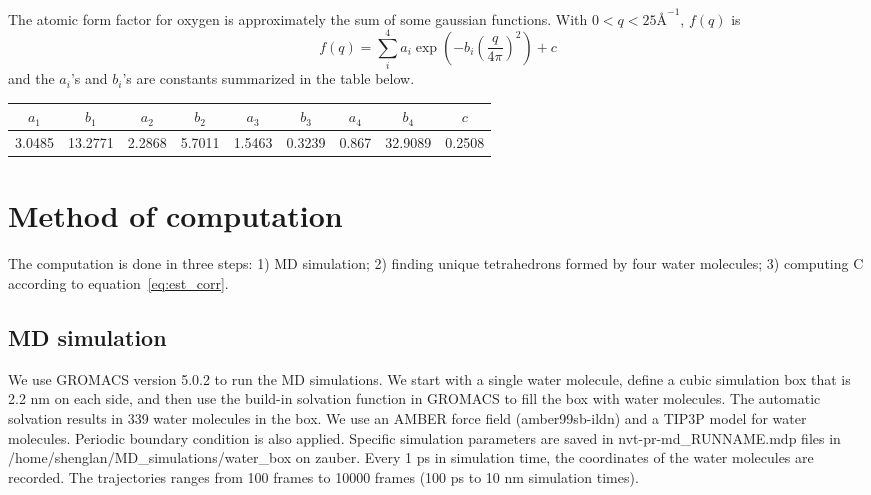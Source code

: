 \documentclass[20pt]{article}
\begin{document}
The atomic form factor for oxygen is approximately the sum of some gaussian functions. With $0 < q < 25 \si{\angstrom} ^{-1}$, $f(q)$ is
\begin{equation} \label{eq:Oform}
f(q) = \sum_{i}^{4} a_i \exp{(-b_i (\frac{q}{4\pi})^2)} + c
\end{equation}
and the $a_i$'s and $b_i$'s are constants summarized in the table below.
\begin{center}
\begin{tabular}{ |c|c|c|c|c|c|c|c|c|} 
 \hline
 $a_1$ & $b_1$ & $a_2$ & $b_2$ &$a_3$ & $b_3$ &$a_4$ & $b_4$ & $c$ \\ 
 \hline
3.0485 & 13.2771 & 2.2868 & 5.7011 & 1.5463 & 0.3239 & 0.867 & 32.9089 & 0.2508 \\ 
 \hline
\end{tabular}
\end{center}

\section{Method of computation}
The computation is done in three steps: 1) MD simulation; 2) finding unique tetrahedrons formed by four water molecules; 3) computing C according to equation~\ref{eq:est_corr}.

\subsection{MD simulation}
We use GROMACS version 5.0.2 to run the MD simulations. We start with a single water molecule, define a cubic simulation box that is 2.2 nm on each side, and then use the build-in solvation function in GROMACS to fill the box with water molecules. The automatic solvation results in 339 water molecules in the box. We use an AMBER force field (amber99sb-ildn) and a TIP3P model for water molecules. Periodic boundary condition is also applied. Specific simulation parameters are saved in nvt-pr-md\_RUNNAME.mdp files in /home/shenglan/MD\_simulations/water\_box on zauber. Every 1 ps in simulation time, the coordinates of the water molecules are recorded. The trajectories ranges from 100 frames to 10000 frames (100 ps to 10 nm simulation times).
\end{document}
